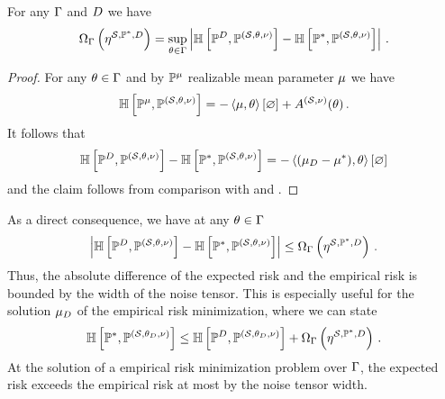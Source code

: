 \begin{lemma}
    \label{lem:centropyWidthCharacterization}
    For any $\Gamma$ and $D$ we have
    \begin{align*}
        \Omega_{\Gamma}\left(\eta^{\mathcal{S},\mathbb{P}^*,D}\right)
        = \sup_{\theta\in\Gamma} \left|\mathbb{H}\left[\mathbb{P}^{D},\mathbb{P}^{(\mathcal{S},\theta,\nu)}\right] - \mathbb{H}\left[\mathbb{P}^*,\mathbb{P}^{(\mathcal{S},\theta,\nu)}\right]\right| \, .
    \end{align*}
\end{lemma}
\begin{proof}
    For any $\theta\in\Gamma$ and by $\mathbb{P}^{\mu}$ realizable mean parameter $\mu$ we have
    \begin{align*}
        \mathbb{H}\left[\mathbb{P}^{\mu},\mathbb{P}^{(\mathcal{S},\theta,\nu)}\right]
        = - \left\langle \mu,\theta\right\rangle \left[ \varnothing \right] + A^{(\mathcal{S},\nu)}(\theta) \, .
    \end{align*}
    It follows that
    \begin{align*}
        \mathbb{H}\left[\mathbb{P}^{D},\mathbb{P}^{(\mathcal{S},\theta,\nu)}\right] - \mathbb{H}\left[\mathbb{P}^*,\mathbb{P}^{(\mathcal{S},\theta,\nu)}\right]
        = -\left\langle (\mu_{D}-\mu^*),\theta\right\rangle \left[ \varnothing \right]
    \end{align*}
    and the claim follows from comparison with  and .
\end{proof}

As a direct consequence, we have at any $\theta\in\Gamma$
\begin{align*}
    \left|\mathbb{H}\left[\mathbb{P}^{D},\mathbb{P}^{(\mathcal{S},\theta,\nu)}\right] - \mathbb{H}\left[\mathbb{P}^*,\mathbb{P}^{(\mathcal{S},\theta,\nu)}\right]\right|
    \leq \Omega_{\Gamma}\left(\eta^{\mathcal{S},\mathbb{P}^*,D}\right) \, .
\end{align*}
Thus, the absolute difference of the expected risk and the empirical risk is bounded by the width of the noise tensor.
This is especially useful for the solution $\mu_{D}$ of the empirical risk minimization, where we can state
\begin{align*}
    \mathbb{H}\left[\mathbb{P}^*,\mathbb{P}^{(\mathcal{S},\theta_{D},\nu)}\right]
    \leq \mathbb{H}\left[\mathbb{P}^{D},\mathbb{P}^{(\mathcal{S},\theta_{D},\nu)}\right] + \Omega_{\Gamma}\left(\eta^{\mathcal{S},\mathbb{P}^*,D}\right) \, .
\end{align*}
At the solution of a empirical risk minimization problem over $\Gamma$, the expected risk exceeds the empirical risk at most by the noise tensor width.

